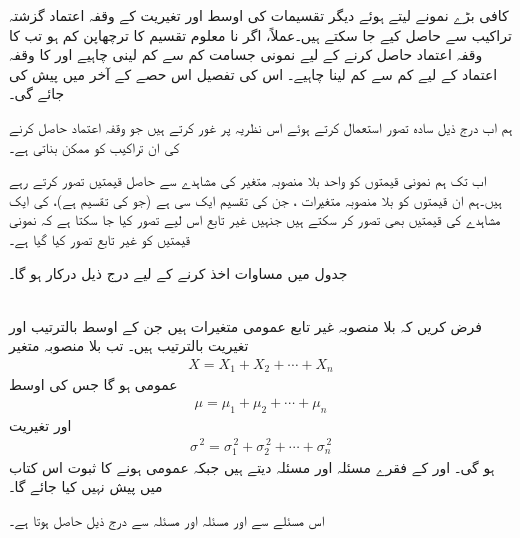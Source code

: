 کافی بڑے نمونے لیتے ہوئے دیگر تقسیمات کی اوسط اور تغیریت کے وقفہ اعتماد گزشتہ تراکیب سے حاصل کیے جا سکتے ہیں۔عملاً، اگر نا معلوم تقسیم کا ترچھاپن کم ہو تب  کا وقفہ اعتماد حاصل کرنے کے لیے  نمونی جسامت کم سے کم  لینی چاہیے  اور  کا وقفہ اعتماد کے لیے کم سے کم  لینا چاہیے۔ اس  کی تفصیل اس حصے کے آخر میں پیش کی جائے گی۔

ہم اب درج ذیل سادہ تصور استعمال کرتے ہوئے اس نظریہ پر غور کرتے ہیں جو وقفہ اعتماد حاصل کرنے کی ان تراکیب کو ممکن بناتی ہے۔

اب تک ہم نمونی قیمتوں  کو واحد بلا منصوبہ متغیر  کی  مشاہدے سے حاصل  قیمتیں تصور کرتے رہے ہیں۔ہم ان  قیمتوں کو  بلا منصوبہ متغیرات ، جن کی تقسیم ایک سی  ہے (جو  کی تقسیم ہے)، کی  ایک مشاہدے کی قیمتیں بھی تصور کر سکتے ہیں جنہیں غیر تابع اس لیے تصور کیا جا سکتا ہے کہ نمونی قیمتیں کو غیر تابع تصور کیا گیا ہے۔

 جدول  میں مساوات  اخذ کرنے  کے لیے درج ذیل درکار ہو گا۔

\quad {}\\
فرض کریں کہ  بلا منصوبہ غیر تابع عمومی متغیرات ہیں جن کے اوسط بالترتیب  اور تغیریت بالترتیب  ہیں۔ تب بلا منصوبہ متغیر
\begin{align*}
X=X_1+X_2+\cdots+X_n
\end{align*}
عمومی ہو گا جس کی اوسط
\begin{align*}
\mu=\mu_1+\mu_2+\cdots+\mu_n
\end{align*}
اور تغیریت
\begin{align*}
\sigma^{\,2}=\sigma^{\,2}_1+\sigma^{\,2}_2+\cdots+\sigma^{\,2}_n
\end{align*}
ہو گی۔ اور  کے فقرے مسئلہ  اور مسئلہ  دیتے ہیں جبکہ  عمومی ہونے کا ثبوت اس کتاب میں پیش نہیں کیا جائے گا۔

اس مسئلے سے اور مسئلہ  اور مسئلہ  سے درج ذیل حاصل ہوتا ہے۔

